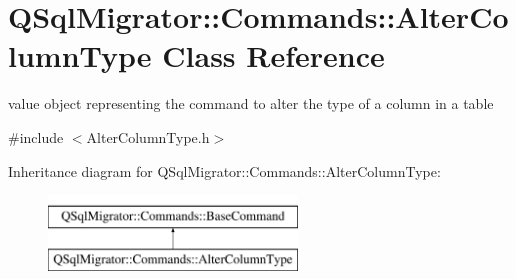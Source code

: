 \hypertarget{class_q_sql_migrator_1_1_commands_1_1_alter_column_type}{}\section{Q\+Sql\+Migrator\+:\+:Commands\+:\+:Alter\+Column\+Type Class Reference}
\label{class_q_sql_migrator_1_1_commands_1_1_alter_column_type}


value object representing the command to alter the type of a column in a table  




{\ttfamily \#include $<$Alter\+Column\+Type.\+h$>$}

Inheritance diagram for Q\+Sql\+Migrator\+:\+:Commands\+:\+:Alter\+Column\+Type\+:\begin{figure}[H]
\begin{center}
\leavevmode
\includegraphics[height=2.000000cm]{class_q_sql_migrator_1_1_commands_1_1_alter_column_type}
\end{center}
\end{figure}
